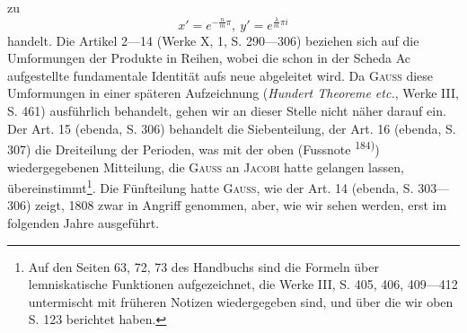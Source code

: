 zu
\[
x'=e^{-\frac{n}{m}\pi},\ y'=e^{\frac{\lambda}{m}\pi i}
\]
\clearpage{}
\noindent handelt. Die Artikel 2—14 (Werke X, 1, S. 290—306) beziehen sich auf
die Umformungen der Produkte in Reihen, wobei die schon in der Scheda
Ac aufgestellte fundamentale Identität aufs neue abgeleitet wird. Da \textsc{Gauss}
diese Umformungen in einer späteren Aufzeichnung (\textit{Hundert Theoreme etc.},
Werke III, S. 461) ausführlich behandelt, gehen wir an dieser Stelle nicht
näher darauf ein. Der Art. 15 (ebenda, S. 306) behandelt die Siebenteilung,
der Art. 16 (ebenda, S. 307) die Dreiteilung der Perioden, was mit der oben
(Fussnote \textsuperscript{184)}) wiedergegebenen Mitteilung, die \textsc{Gauss} an \textsc{Jacobi} hatte gelangen
lassen, übereinstimmt\footnote{Auf den Seiten 63, 72, 73 des Handbuchs sind die Formeln über lemniskatische Funktionen aufgezeichnet, die Werke III, S. 405, 406, 409—412 untermischt mit früheren Notizen wiedergegeben sind, und über die wir oben S. 123 berichtet haben.}. Die Fünfteilung hatte \textsc{Gauss}, wie der Art. 14
(ebenda, S. 303—306) zeigt, 1808 zwar in Angriff genommen, aber, wie wir
sehen werden, erst im folgenden Jahre ausgeführt.
